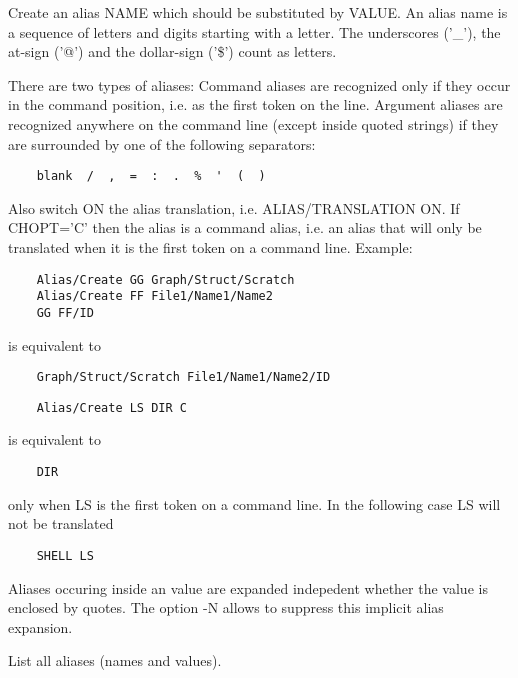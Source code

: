    \par
Create an alias NAME which should be substituted by VALUE.  An alias name 
   is a sequence of letters and digits starting with a letter.  The 
   underscores ('_'), the at-sign ('@') and the dollar-sign ('\$') count as 
   letters.  

   \par
There are two types of aliases:  Command aliases are recognized only if 
   they occur in the command position, i.e. as the first token on the line.  
   Argument aliases are recognized anywhere on the command line (except inside 
   quoted strings) if they are surrounded by one of the following separators:  
\begin{verbatim}
    blank  /  ,  =  :  .  %  '  (  )
\end{verbatim}
\ENDVERB
   \par
Also switch ON the alias translation, i.e. ALIAS/TRANSLATION ON.  If 
   CHOPT='C' then the alias is a command alias, i.e. an alias that will only 
   be translated when it is the first token on a command line.  Example:  
\begin{verbatim}
    Alias/Create GG Graph/Struct/Scratch
    Alias/Create FF File1/Name1/Name2
    GG FF/ID
\end{verbatim}
   \par
is equivalent to 
\begin{verbatim}
    Graph/Struct/Scratch File1/Name1/Name2/ID
\end{verbatim}
\begin{verbatim}
    Alias/Create LS DIR C
\end{verbatim}
   \par
is equivalent to 
\begin{verbatim}
    DIR
\end{verbatim}
   \par
only when LS is the first token on a command line.  In the following case 
   LS will not be translated 
\begin{verbatim}
    SHELL LS
\end{verbatim}
\ENDVERB
   \par
Aliases occuring inside an value are expanded indepedent whether the value 
   is enclosed by quotes.  The option -N allows to suppress this implicit 
   alias expansion.  

\ENDCMD


   \par
List all aliases (names and values).  


